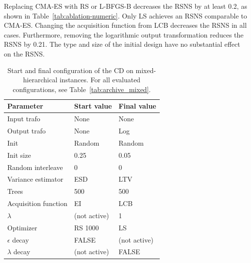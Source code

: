 \documentclass[12pt,letterpaper]{article}
\begin{document}
Replacing CMA-ES with RS or L-BFGS-B decreases the RSNS by at least 0.2, as shown in Table~\ref{tab:ablation-numeric}.
Only LS achieves an RSNS comparable to CMA-ES.
Changing the acquisition function from LCB decreases the RSNS in all cases.
Furthermore, removing the logarithmic output transformation reduces the RSNS by 0.21.
The type and size of the initial design have no substantial effect on the RSNS.



\begin{table}[ht]
  \centering
  \caption{Start and final configuration of the CD on mixed-hierarchical instances.
    For all evaluated configurations, see Table~\ref{tab:archive_mixed}.}
  \label{tab:mlr3mbo-results-mixed}
  \begin{tabular}{lll}
    \toprule
    Parameter            & Start value & Final value \\
    \midrule
    Input trafo          & None          & None        \\
    Output trafo         & None          & Log         \\
    Init                 & Random        & Random      \\
    Init size            & 0.25          & 0.05        \\
    Random interleave    & 0             & 0           \\
    Variance estimator   & ESD           & LTV         \\
    Trees                & 500           & 500         \\
    Acquisition function & EI            & LCB         \\
    $\lambda$            & (not active)              & 1           \\
    Optimizer               & RS 1000       & LS          \\
    $\epsilon$ decay     & FALSE         & (not active)            \\
    $\lambda$ decay      & (not active)              & FALSE       \\
    \bottomrule
  \end{tabular}
\end{table}
\end{document}
